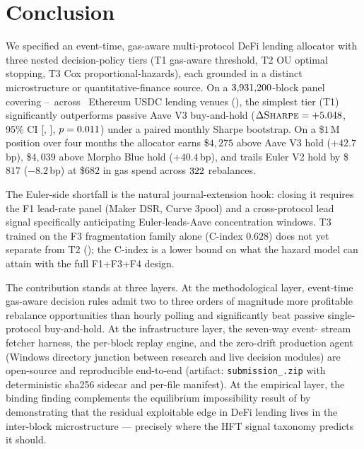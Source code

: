 \section{Conclusion}
\label{sec:conclusion}

We specified an event-time, gas-aware multi-protocol DeFi lending
allocator with three nested decision-policy tiers (T1 gas-aware
threshold, T2 OU optimal stopping, T3 Cox proportional-hazards),
each grounded in a distinct microstructure or quantitative-finance
source.  On a $3{,}931{,}200$-block panel covering
\DataStart--\DataEnd\ across \NProtocols\ Ethereum USDC lending
venues (\ProtocolList), the simplest tier (T1) significantly
outperforms passive Aave V3 buy-and-hold
($\Delta\textsc{Sharpe} = +5.048$, 95\% CI
[\HOneAuxCIlow, \HOneAuxCIhigh], $p = 0.011$) under a
paired monthly Sharpe bootstrap.  On a \$$1$\,M position over four
months the allocator earns \$$4{,}275$ above Aave V3 hold
($+42.7$\,bp), \$$4{,}039$ above Morpho Blue hold ($+40.4$\,bp), and
trails Euler V2 hold by \$$817$ ($-8.2$\,bp) at \$$682$ in gas spend
across $322$ rebalances.

The Euler-side shortfall is the natural journal-extension hook:
closing it requires the F1 lead-rate panel (Maker DSR, Curve 3pool)
and a cross-protocol lead signal specifically anticipating
Euler-leads-Aave concentration windows.  T3 trained on the F3
fragmentation family alone (C-index $0.628$) does not yet separate
from T2 (); the C-index is a lower bound
on what the hazard model can attain with the full F1+F3+F4 design.

The contribution stands at three layers.  At the methodological
layer, event-time gas-aware decision rules admit two to three
orders of magnitude more profitable rebalance opportunities than
hourly polling and significantly beat passive single-protocol
buy-and-hold.  At the infrastructure layer, the seven-way event-
stream fetcher harness, the per-block replay engine, and the
zero-drift production agent (Windows directory junction between
research and live decision modules) are open-source and reproducible
end-to-end (artifact: \texttt{submission\_<git-sha>.zip} with
deterministic sha256 sidecar and per-file manifest).  At the
empirical layer, the binding finding complements the equilibrium
impossibility result of \cite{halpern2024fair} by demonstrating
that the residual exploitable edge in DeFi lending lives in the
inter-block microstructure --- precisely where the
\cite{mackenzie2021} HFT signal taxonomy predicts it should.

